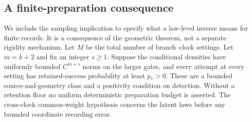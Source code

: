 \subsection{A finite-preparation consequence}

We include the sampling implication to specify what a law-level inverse
means for finite records.  It is a consequence of the geometric theorem,
not a separate rigidity mechanism.  Let $M$ be the total number of
branch--clock settings.  Let $m=k+2$ and fix an integer $s\ge1$.
Suppose the conditional densities have uniformly bounded
$C^{m+s}$ norms on the larger gates, and every attempt at every setting
has retained-success probability at least $p_*>0$.  These are a bounded
source-and-geometry class and a positivity condition on detection.
Without a retention floor no uniform deterministic preparation budget
is asserted.  The cross-clock common-weight hypothesis concerns the
latent laws before any bounded coordinate recording error.

